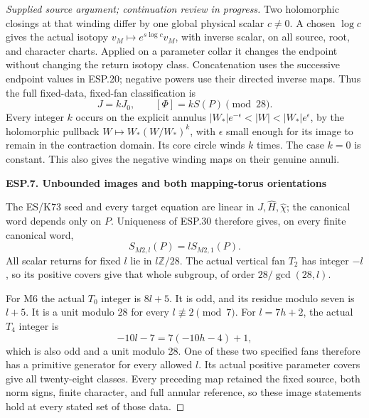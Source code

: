 \begin{proof}[Supplied source argument; continuation review in progress]
Two holomorphic closings at that winding differ by one global
physical scalar \(c\ne0\). A chosen \(\log c\) gives the actual
isotopy \(v_M\mapsto e^{s\log c}v_M\), with inverse scalar,
on all source, root, and character charts. Applied on a parameter
collar it changes the endpoint without changing the return isotopy
class. Concatenation uses the successive endpoint values in ESP.20;
negative powers use their directed inverse maps. Thus the full
fixed-data, fixed-fan classification is
\[
               J=kJ_0,\qquad [\Phi]=kS(P)\pmod {28}.
 \tag{ESP.34}
\]
Every integer \(k\) occurs on the explicit annulus
\(|W_*|e^{-\epsilon}<|W|<|W_*|e^{\epsilon}\), by the
holomorphic pullback \(W\mapsto W_*(W/W_*)^k\), with
\(\epsilon\) small enough for its image to remain in the
contraction domain. Its core circle winds \(k\) times. The
case \(k=0\) is constant. This also gives the negative winding
maps on their genuine annuli.

\par

\medskip\noindent\textbf{ESP.7. Unbounded images and both mapping-torus orientations}

\par\nobreak

The ES/K73 seed and every target equation are linear in
\(J,\widehat H,\widehat\chi\); the canonical word depends
only on \(P\). Uniqueness of ESP.30 therefore gives, on every
finite canonical word,
\[
                       S_{M2,l}(P)=lS_{M2,1}(P).
 \tag{ESP.35}
\]
All scalar returns for fixed \(l\) lie in \(l\mathbb Z/28\).
The actual vertical fan \(T_2\) has integer \(-l\), so its
positive covers give that whole subgroup, of order
\(28/\gcd(28,l)\).

For M6 the actual \(T_0\) integer is \(8l+5\). It is odd,
and its residue modulo seven is \(l+5\). It is a unit modulo
28 for every \(l\not\equiv2\pmod7\). For
\(l=7h+2\), the actual \(T_4\) integer is
\[
                  -10l-7=7(-10h-4)+1,
 \tag{ESP.36}
\]
which is also odd and a unit modulo 28. One of these two specified
fans therefore has a primitive generator for every allowed \(l\).
Its actual positive parameter covers give all twenty-eight classes.
Every preceding map retained the fixed source, both norm signs,
finite character, and full annular reference, so these image
statements hold at every stated set of those data.


\end{proof}
